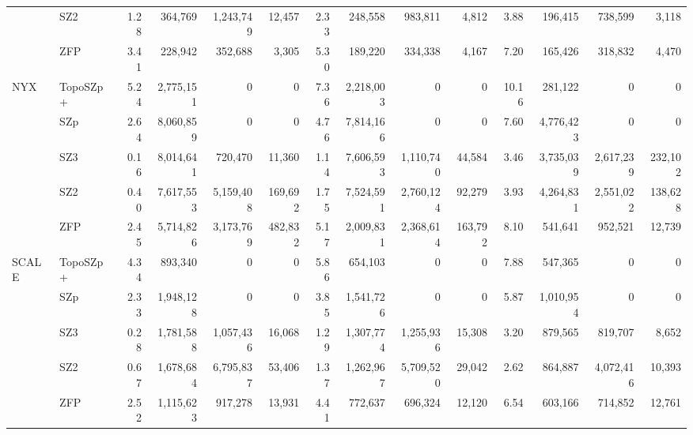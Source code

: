 \begin{tabular}{@{}llrrrrrrrrrrrr@{}}
 & SZ2 & 1.28 & 364{,}769 & 1{,}243{,}749 & 12{,}457 & 2.33 & 248{,}558 & 983{,}811 & 4{,}812 & 3.88 & 196{,}415 & 738{,}599 & 3{,}118 \\
 & ZFP & 3.41 & 228{,}942 & 352{,}688 & 3{,}305 & 5.30 & 189{,}220 & 334{,}338 & 4{,}167 & 7.20 & 165{,}426 & 318{,}832 & 4{,}470 \\
\midrule
NYX & TopoSZp+ & 5.24 & 2{,}775{,}151 & 0 & 0 & 7.36 & 2{,}218{,}003 & 0 & 0 & 10.16 & 281{,}122 & 0 & 0 \\
 & SZp & 2.64 & 8{,}060{,}859 & 0 & 0 & 4.76 & 7{,}814{,}166 & 0 & 0 & 7.60 & 4{,}776{,}423 & 0 & 0 \\
 & SZ3 & 0.16 & 8{,}014{,}641 & 720{,}470 & 11{,}360 & 1.14 & 7{,}606{,}593 & 1{,}110{,}740 & 44{,}584 & 3.46 & 3{,}735{,}039 & 2{,}617{,}239 & 232{,}102 \\
 & SZ2 & 0.40 & 7{,}617{,}553 & 5{,}159{,}408 & 169{,}692 & 1.75 & 7{,}524{,}591 & 2{,}760{,}124 & 92{,}279 & 3.93 & 4{,}264{,}831 & 2{,}551{,}022 & 138{,}628 \\
 & ZFP & 2.45 & 5{,}714{,}826 & 3{,}173{,}769 & 482{,}832 & 5.17 & 2{,}009{,}831 & 2{,}368{,}614 & 163{,}792 & 8.10 & 541{,}641 & 952{,}521 & 12{,}739 \\
\midrule
SCALE & TopoSZp+ & 4.34 & 893{,}340 & 0 & 0 & 5.86 & 654{,}103 & 0 & 0 & 7.88 & 547{,}365 & 0 & 0 \\
 & SZp & 2.33 & 1{,}948{,}128 & 0 & 0 & 3.85 & 1{,}541{,}726 & 0 & 0 & 5.87 & 1{,}010{,}954 & 0 & 0 \\
 & SZ3 & 0.28 & 1{,}781{,}588 & 1{,}057{,}436 & 16{,}068 & 1.29 & 1{,}307{,}774 & 1{,}255{,}936 & 15{,}308 & 3.20 & 879{,}565 & 819{,}707 & 8{,}652 \\
 & SZ2 & 0.67 & 1{,}678{,}684 & 6{,}795{,}837 & 53{,}406 & 1.37 & 1{,}262{,}967 & 5{,}709{,}520 & 29{,}042 & 2.62 & 864{,}887 & 4{,}072{,}416 & 10{,}393 \\
 & ZFP & 2.52 & 1{,}115{,}623 & 917{,}278 & 13{,}931 & 4.41 & 772{,}637 & 696{,}324 & 12{,}120 & 6.54 & 603{,}166 & 714{,}852 & 12{,}761 \\
\bottomrule
\end{tabular}
